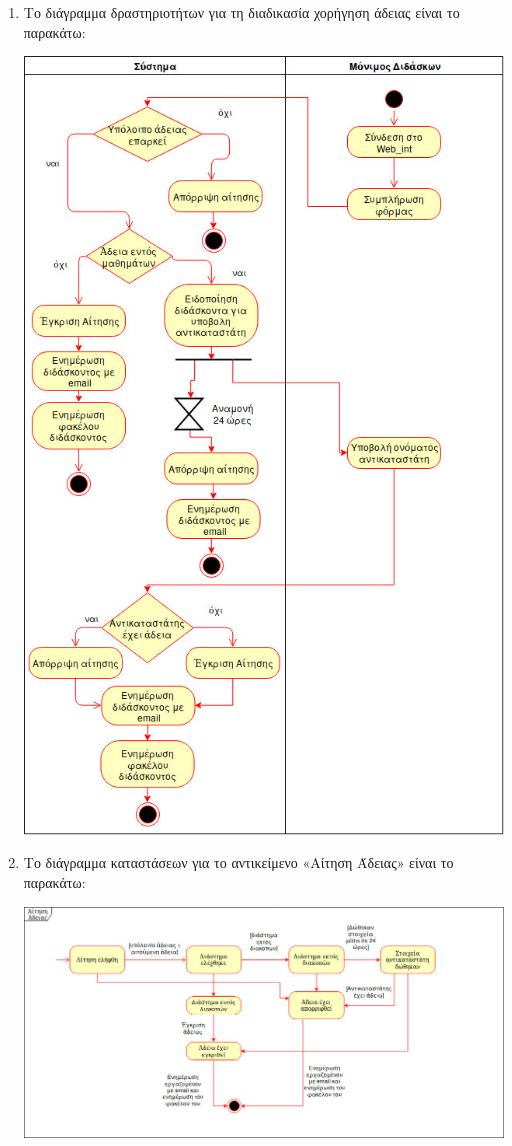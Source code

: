 \documentclass[12pt]{article}
\begin{document}
\begin{enumerate}
\item
Το διάγραμμα δραστηριοτήτων για τη διαδικασία χορήγηση άδειας είναι το παρακάτω:\\
\begin{center}
\includegraphics[scale=0.5]{activity}
\end{center}

\item
Το διάγραμμα καταστάσεων για το αντικείμενο «Αίτηση Άδειας» είναι το παρακάτω:\\
\begin{center}
\includegraphics[scale=0.4]{state_diag}
\end{center}


\end{enumerate}
\end{document}

